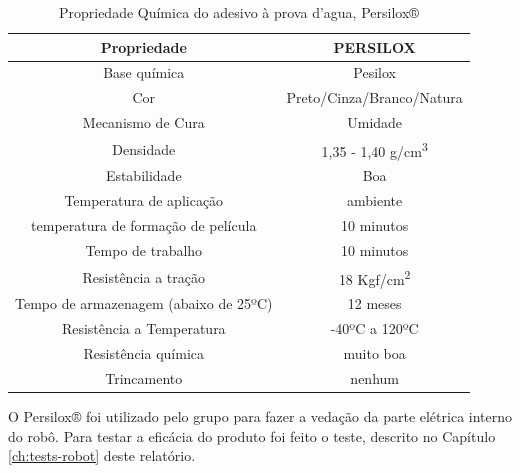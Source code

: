\begin{table}[h]
\centering
\caption{Propriedade Química do adesivo à prova d’agua, Persilox®}
\label{tab:table-compare-persilox}
\begin{tabular}{@{}|c|c|@{}}
\toprule
Propriedade                           & PERSILOX                  \\ \midrule
Base química                          & Pesilox                   \\ \midrule
Cor                                   & Preto/Cinza/Branco/Natura \\ \midrule
Mecanismo de Cura                     & Umidade                   \\ \midrule
Densidade                             & 1,35 - 1,40 g/cm\textsuperscript{3}         \\ \midrule
Estabilidade                          & Boa                       \\ \midrule
Temperatura de aplicação              & ambiente                  \\ \midrule
temperatura de formação de película   & 10 minutos                \\ \midrule
Tempo de trabalho                     & 10 minutos                \\ \midrule
Resistência a tração                  & 18 Kgf/cm\textsuperscript{2}                \\ \midrule
Tempo de armazenagem (abaixo de 25ºC) & 12 meses                  \\ \midrule
Resistência a Temperatura             & -40ºC a 120ºC             \\ \midrule
Resistência química                   & muito boa                 \\ \midrule
Trincamento                           & nenhum                    \\ \bottomrule
\end{tabular}
\end{table}

O Persilox® foi utilizado pelo grupo para fazer a vedação da parte elétrica interno do robô. Para testar a eficácia do produto foi feito o teste, descrito no Capítulo \ref{ch:tests-robot} deste relatório.
